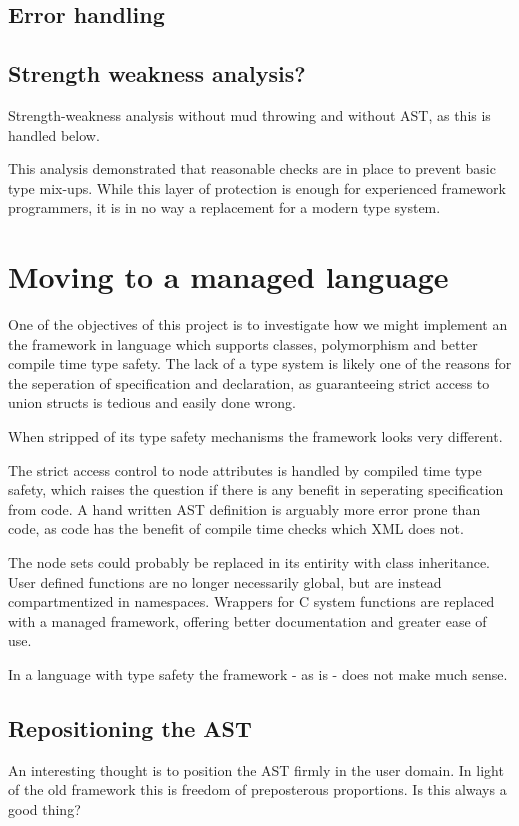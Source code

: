 \documentclass[final,a4paper,12pt]{article}
\begin{document}
\subsection{Error handling}
\subsection{Strength weakness analysis?}
Strength-weakness analysis without mud throwing and without AST, as this is handled below.

This analysis demonstrated that reasonable checks are in place to prevent basic type mix-ups. While this layer of protection is enough for experienced framework programmers, it is in no way a replacement for a modern type system.


\section{Moving to a managed language}
One of the objectives of this project is to investigate how we might implement an the framework in language which supports classes, polymorphism and better compile time type safety. The lack of a type system is likely one of the reasons for the seperation of specification and declaration, as guaranteeing strict access to union structs is tedious and easily done wrong.

When stripped of its type safety mechanisms the framework looks very different.

The strict access control to node attributes is handled by compiled time type safety, which raises the question if there is any benefit in seperating specification from code. A hand written AST definition is arguably more error prone than code, as code has the benefit of compile time checks which XML does not.

The node sets could probably be replaced in its entirity with class inheritance. User defined functions are no longer necessarily global, but are instead compartmentized in namespaces. Wrappers for C system functions are replaced with a managed framework, offering better documentation and greater ease of use.

In a language with type safety the framework - as is - does not make much sense.

\subsection{Repositioning the AST}
An interesting thought is to position the AST firmly in the user domain. In light of the old framework this is freedom of preposterous proportions. Is this always a good thing?
\end{document}
